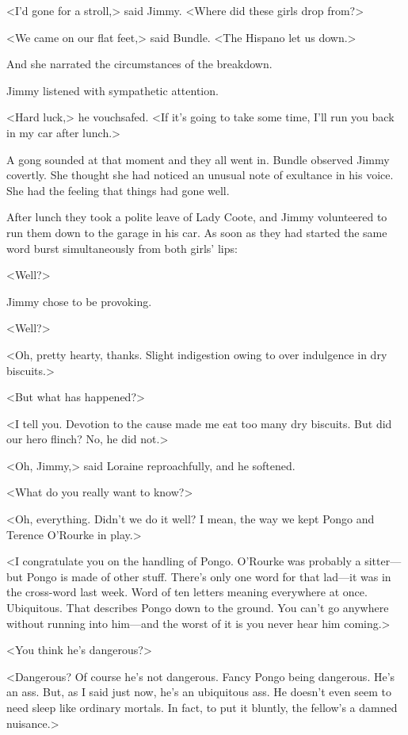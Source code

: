 <I'd gone for a stroll,> said Jimmy. <Where did these girls drop from?>

<We came on our flat feet,> said Bundle. <The Hispano let us down.>

And she narrated the circumstances of the breakdown.

Jimmy listened with sympathetic attention.

<Hard luck,> he vouchsafed. <If it's going to take some time, I'll run you back in my car after lunch.>

A gong sounded at that moment and they all went in. Bundle observed Jimmy covertly. She thought she had noticed an unusual note of exultance in his voice. She had the feeling that things had gone well.

After lunch they took a polite leave of Lady Coote, and Jimmy volunteered to run them down to the garage in his car. As soon as they had started the same word burst simultaneously from both girls' lips:

<Well?>

Jimmy chose to be provoking.

<Well?>

<Oh, pretty hearty, thanks. Slight indigestion owing to over indulgence in dry biscuits.>

<But what has happened?>

<I tell you. Devotion to the cause made me eat too many dry biscuits. But did our hero flinch? No, he did not.>

<Oh, Jimmy,> said Loraine reproachfully, and he softened.

<What do you really want to know?>

<Oh, everything. Didn't we do it well? I mean, the way we kept Pongo and Terence O'Rourke in play.>

<I congratulate you on the handling of Pongo. O'Rourke was probably a sitter—but Pongo is made of other stuff. There's only one word for that lad—it was in the  cross-word last week. Word of ten letters meaning everywhere at once. Ubiquitous. That describes Pongo down to the ground. You can't go anywhere without running into him—and the worst of it is you never hear him coming.>

<You think he's dangerous?>

<Dangerous? Of course he's not dangerous. Fancy Pongo being dangerous. He's an ass. But, as I said just now, he's an ubiquitous ass. He doesn't even seem to need sleep like ordinary mortals. In fact, to put it bluntly, the fellow's a damned nuisance.>

